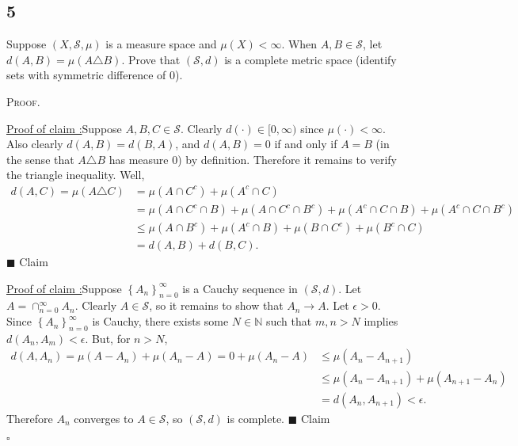 \documentclass[12pt]{article}
\newcounter{ProofCounter}
\newcounter{ClaimCounter}[ProofCounter]
\newenvironment{Proof}{\stepcounter{ProofCounter}\textsc{Proof.}}{\hfill$\square$}
\newenvironment{claim}[1]{\vspace{1mm}\stepcounter{ClaimCounter}\par\noindent\underline{\bf Claim \theClaimCounter:}\space#1}{}
\newenvironment{claimproof}[1]{\par\noindent\underline{Proof of claim \theClaimCounter:}\space#1}{\hfill $\blacksquare$ Claim \theClaimCounter}
\begin{document}
\subsection*{5}
\begin{tcolorbox}
  Suppose $(X,\mathcal{S}, \mu)$ is a measure space and $\mu(X) < \infty$. When $A,B \in \mathcal{S}$, let $d(A,B) = \mu(A\triangle B)$. Prove that 
  $(\mathcal{S}, d)$ is a complete metric space (identify sets with symmetric difference of 0).
\end{tcolorbox}
\begin{Proof}
  \begin{claimproof}
    Suppose $A,B,C \in \mathcal{S}$.
    Clearly $d(\cdot) \in [0,\infty)$ since $\mu(\cdot) < \infty$. Also clearly $d(A,B) = d(B,A)$, and $d(A,B) = 0$ if and only if $A = B$ %
    (in the sense that $A\triangle B$ has measure 0)
    by definition. Therefore it remains to verify the triangle inequality. Well,
    \begin{align*}
      d(A,C) = \mu(A\triangle C) & = \mu(A\cap C^{c}) + \mu(A^{c}\cap C) \\
      & = \mu(A\cap C^{c} \cap B) + \mu(A\cap C^{c}\cap B^{c}) + \mu(A^{c}\cap C\cap B) + \mu(A^{c}\cap C\cap B^{c}) \\
      & \leq \mu(A\cap B^{c}) + \mu(A^{c} \cap B) + \mu(B\cap C^{c}) + \mu(B^{c}\cap C) \\
      & = d(A,B) + d(B,C).
    \end{align*}
  \end{claimproof}

  \begin{claimproof}
    Suppose $\left\{ A_n \right\}_{n=0}^{\infty}$ is a Cauchy sequence in $(\mathcal{S}, d)$. Let $A = \cap_{n=0}^{\infty}A_n$. Clearly $A \in
    \mathcal{S}$, so it remains to show that $A_n \rightarrow A$. Let $\epsilon > 0$. Since $\left\{ A_n \right\}_{n=0}^{\infty}$ is Cauchy, there
    exists some $N \in \mathbb{N}$ such that $m,n > N$ implies $d(A_n, A_m) < \epsilon$. But, for $n > N$,
    \begin{align*}
      d(A,A_n) = \mu(A - A_n) + \mu(A_n - A) = 0 + \mu(A_n - A) & \leq \mu(A_n - A_{n+1}) \\
      & \leq \mu(A_n - A_{n+1}) + \mu(A_{n+1} - A_n) \\
      & = d(A_n, A_{n+1}) < \epsilon.
    \end{align*}
    Therefore $A_n$ converges to $A \in \mathcal{S}$, so $(\mathcal{S}, d)$ is complete.
  \end{claimproof}

\end{Proof}
\end{document}
